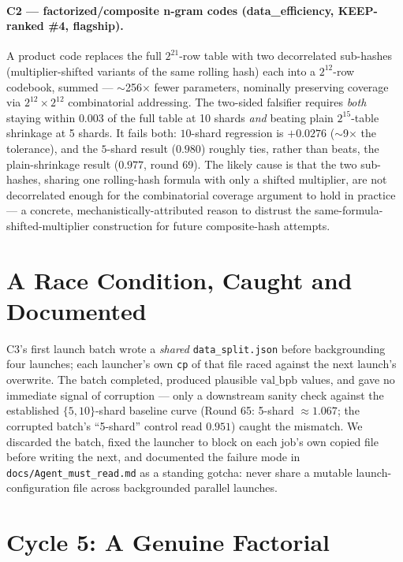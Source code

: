 \documentclass{article}
\newcommand{\valbpb}{\mathrm{val\_bpb}}
\begin{document}
\paragraph{C2 --- factorized/composite n-gram codes (data\_efficiency, KEEP-ranked \#4, flagship).} A product code replaces the full $2^{21}$-row table with two decorrelated sub-hashes (multiplier-shifted variants of the same rolling hash) each into a $2^{12}$-row codebook, summed --- $\sim$256$\times$ fewer parameters, nominally preserving coverage via $2^{12}\times2^{12}$ combinatorial addressing. The two-sided falsifier requires \emph{both} staying within $0.003$ of the full table at 10 shards \emph{and} beating plain $2^{15}$-table shrinkage at 5 shards. It fails both: $10$-shard regression is $+0.0276$ ($\sim$9$\times$ the tolerance), and the $5$-shard result ($0.980$) roughly ties, rather than beats, the plain-shrinkage result ($0.977$, round 69). The likely cause is that the two sub-hashes, sharing one rolling-hash formula with only a shifted multiplier, are not decorrelated enough for the combinatorial coverage argument to hold in practice --- a concrete, mechanistically-attributed reason to distrust the same-formula-shifted-multiplier construction for future composite-hash attempts.

\section{A Race Condition, Caught and Documented}
\label{sec:race}
C3's first launch batch wrote a \emph{shared} \texttt{data\_split.json} before backgrounding four launches; each launcher's own \texttt{cp} of that file raced against the next launch's overwrite. The batch completed, produced plausible $\valbpb$ values, and gave no immediate signal of corruption --- only a downstream sanity check against the established $\{5,10\}$-shard baseline curve (Round 65: 5-shard $\approx1.067$; the corrupted batch's ``5-shard'' control read $0.951$) caught the mismatch. We discarded the batch, fixed the launcher to block on each job's own copied file before writing the next, and documented the failure mode in \texttt{docs/Agent\_must\_read.md} as a standing gotcha: never share a mutable launch-configuration file across backgrounded parallel launches.

\section{Cycle 5: A Genuine Factorial}
\label{sec:factorial}
\end{document}
